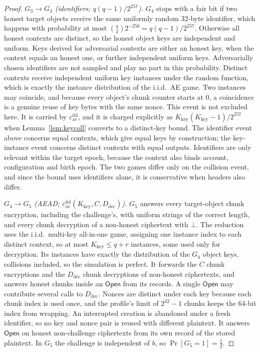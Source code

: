 \documentclass[pdflatex,sn-mathphys-num,twocolumn]{sn-jnl}
\theoremstyle{plain}
\theoremstyle{definition}
\begin{document}
\begin{proof}
\emph{$G_3\to G_4$ (identifiers; $q(q-1)/2^{257}$).} $G_4$ stops with a fair bit if two honest target objects receive the same uniformly random 32-byte identifier, which happens with probability at most $\binom q2 2^{-256}=q(q-1)/2^{257}$. Otherwise all honest contexts are distinct, so the honest object keys are independent and uniform. Keys derived for adversarial contexts are either an honest key, when the context equals an honest one, or further independent uniform keys. Adversarially chosen identifiers are not sampled and play no part in this probability. Distinct contexts receive independent uniform key instances under the random function, which is exactly the instance distribution of the i.i.d.\ AE game. Two instances may coincide, and because every object's chunk counter starts at $0$, a coincidence is a genuine reuse of key bytes with the same nonce. This event is not excluded here. It is carried by $\varepsilon^{\mathrm{iid}}_{\mathrm{ae}}$, and it is charged explicitly as $K_{\mathrm{key}}(K_{\mathrm{key}}-1)/2^{257}$ when Lemma~\ref{lem:keycoll} converts to a distinct-key bound. The identifier event above concerns equal contexts, which give equal keys by construction; the key-instance event concerns distinct contexts with equal outputs. Identifiers are only relevant within the target epoch, because the context also binds account, configuration and birth epoch. The two games differ only on the collision event, and since the bound uses identifiers alone, it is conservative when headers also differ.

\emph{$G_4\to G_5$ (AEAD; $\varepsilon^{\mathrm{iid}}_{\mathrm{ae}}(K_{\mathrm{key}},C,D_{\mathrm{dec}})$).} $G_5$ answers every target-object chunk encryption, including the challenge's, with uniform strings of the correct length, and every chunk decryption of a non-honest ciphertext with $\bot$. The reduction uses the i.i.d.\ multi-key all-in-one game, assigning one instance index to each distinct context, so at most $K_{\mathrm{key}}\le q+r$ instances, some used only for decryption. Its instances have exactly the distribution of the $G_4$ object keys, collisions included, so the simulation is perfect. It forwards the $C$ chunk encryptions and the $D_{\mathrm{dec}}$ chunk decryptions of non-honest ciphertexts, and answers honest chunks inside an $\mathsf{Open}$ from its records. A single $\mathsf{Open}$ may contribute several calls to $D_{\mathrm{dec}}$. Nonces are distinct under each key because each chunk index is used once, and the profile's limit of $2^{32}-1$ chunks keeps the 64-bit index from wrapping. An interrupted creation is abandoned under a fresh identifier, so no key and nonce pair is reused with different plaintext. It answers $\mathsf{Open}$ on honest non-challenge ciphertexts from its own record of the stored plaintext. In $G_5$ the challenge is independent of $b$, so $\Pr[G_5=1]=\tfrac12$.


\end{proof}
\end{document}
